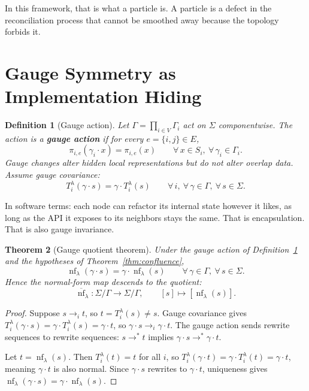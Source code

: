 \documentclass[11pt]{article}
\newtheorem{theorem}{Theorem}[section]
\newtheorem{definition}[theorem]{Definition}
\begin{document}
In this framework, that is what a particle is. A particle is a defect in the reconciliation process that cannot be smoothed away because the topology forbids it.


\section{Gauge Symmetry as Implementation Hiding}

\begin{definition}[Gauge action]\label{def:gauge}
Let $\Gamma = \prod_{i\in V}\Gamma_i$ act on $\Sigma$ componentwise. The action is a \textbf{gauge action} if for every $e=\{i,j\}\in E$,
\[
\pi_{i,e}(\gamma_i\cdot x)=\pi_{i,e}(x)
\qquad
\forall\, x\in S_i,\ \forall\, \gamma_i\in \Gamma_i.
\]
Gauge changes alter hidden local representations but do not alter overlap data. Assume gauge covariance:
\[
T_i^\lambda(\gamma\cdot s)=\gamma\cdot T_i^\lambda(s)
\qquad
\forall\, i,\ \forall\, \gamma\in\Gamma,\ \forall\, s\in\Sigma.
\]
\end{definition}

In software terms: each node can refactor its internal state however it likes, as long as the API it exposes to its neighbors stays the same. That is encapsulation. That is also gauge invariance.

\begin{theorem}[Gauge quotient theorem]\label{thm:gauge}
Under the gauge action of Definition~\ref{def:gauge} and the hypotheses of Theorem~\ref{thm:confluence},
\[
\operatorname{nf}_\lambda(\gamma\cdot s)
=
\gamma\cdot \operatorname{nf}_\lambda(s)
\qquad
\forall\, \gamma\in\Gamma,\ \forall\, s\in\Sigma.
\]
Hence the normal-form map descends to the quotient:
\[
\overline{\operatorname{nf}}_\lambda:\Sigma/\Gamma \to \Sigma/\Gamma,
\qquad
[s]\mapsto [\operatorname{nf}_\lambda(s)].
\]
\end{theorem}

\begin{proof}
Suppose $s\to_i t$, so $t=T_i^\lambda(s)\neq s$. Gauge covariance gives $T_i^\lambda(\gamma\cdot s) = \gamma\cdot T_i^\lambda(s) = \gamma\cdot t$, so $\gamma\cdot s\to_i \gamma\cdot t$. The gauge action sends rewrite sequences to rewrite sequences: $s\to^* t$ implies $\gamma\cdot s\to^* \gamma\cdot t$.

Let $t=\operatorname{nf}_\lambda(s)$. Then $T_i^\lambda(t)=t$ for all $i$, so $T_i^\lambda(\gamma\cdot t) = \gamma\cdot T_i^\lambda(t) = \gamma\cdot t$, meaning $\gamma\cdot t$ is also normal. Since $\gamma\cdot s$ rewrites to $\gamma\cdot t$, uniqueness gives $\operatorname{nf}_\lambda(\gamma\cdot s) = \gamma\cdot\operatorname{nf}_\lambda(s)$.
\end{proof}
\end{document}

